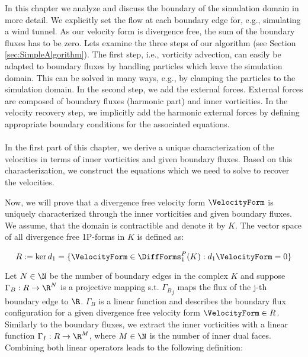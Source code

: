 \label{ch:boundaryFluxes}
In this chapter we analyze and discuss the boundary of the simulation domain in more detail.
We explicitly set the flow at each boundary edge for, e.g., simulating a wind tunnel.
As our velocity form is divergence free, the sum of the boundary fluxes has to be zero.
Lets examine the three steps of our algorithm (see Section \ref{sec:SimpleAlgorithm}).
The first step, i.e., vorticity advection, can easily be adapted to boundary fluxes by handling particles which leave the simulation domain. 
This can be solved in many ways, e.g., by clamping the particles to the simulation domain.
In the second step, we add the external forces.
External forces are composed of boundary fluxes (harmonic part) and inner vorticities.
In the velocity recovery step, we implicitly add the harmonic external forces by defining appropriate boundary conditions for the associated equations.

\paragraph*{}
In the first part of this chapter, we derive a unique characterization of the velocities in terms of inner vorticities and given boundary fluxes.
Based on this characterization, we construct the equations which we need to solve to recover the velocities.

\label{sec:VorticityRepresentation}
Now, we will prove that a divergence free velocity form $\VelocityForm$ is uniquely characterized through the inner vorticities and given boundary fluxes.
We assume, that the domain is contractible and denote it by $K$.
The vector space of all divergence free 1P-forms in $K$ is defined as:

\begin{equation}
R := \ker d_1 = \{ \VelocityForm \in \DiffForms^P_1(K) : d_1 \VelocityForm = 0 \}
\end{equation}

Let $N \in \N$ be the number of boundary edges in the complex $K$ and suppose $\Gamma_B : R \rightarrow \R^N$ is a projective mapping s.t. ${\Gamma_B}_j$ maps the flux of the j-th boundary edge to $\R$.
$\Gamma_B$ is a linear function and describes the boundary flux configuration for a given divergence free velocity form $\VelocityForm \in R$. 
Similarly to the boundary fluxes, we extract the inner vorticities with a linear function
$\Gamma_I : R \rightarrow \R^M$, where $M \in \N$ is the number of inner dual faces.
Combining both linear operators leads to the following definition:

